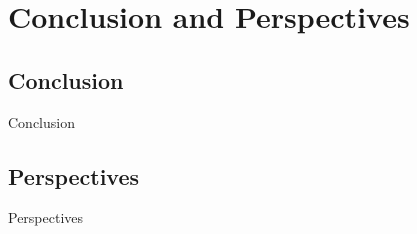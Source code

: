 \section{Conclusion and Perspectives}


\subsection{Conclusion}

\begin{frame}{Conclusion}
    
\end{frame}

\subsection{Perspectives}

\begin{frame}{Perspectives}
    
\end{frame}
